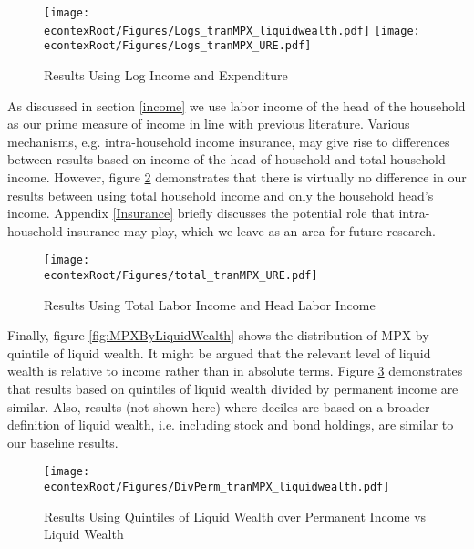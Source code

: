 \documentclass[titlepage]{\econtex}\newcommand{\texname}{ConsumptionHeterogeneity}
\begin{document}
\begin{figure} 
	\begin{centering}
		\texttt{[image: \\econtexRoot/Figures/Logs\_tranMPX\_liquidwealth.pdf]}
		\texttt{[image: \\econtexRoot/Figures/Logs\_tranMPX\_URE.pdf]}
		\caption{Results Using Log Income and Expenditure}
		\label{fig:Robust_Logs}
	\end{centering}
\end{figure}

As discussed in section \ref{income} we use labor income of the head of the household as our prime measure of income in line with previous literature. Various mechanisms, e.g. intra-household income insurance, may give rise to differences between results based on income of the head of household and total household income. However, figure \ref{fig:Robust_TotalvsHead} demonstrates that there is virtually no difference in our results between using total household income and only the household head's income. Appendix \ref{Insurance} briefly discusses the potential role that intra-household insurance may play, which we leave as an area for future research. 

\begin{figure} 
	\begin{centering}
		\texttt{[image: \\econtexRoot/Figures/total\_tranMPX\_URE.pdf]}
		\caption{Results Using Total Labor Income and Head Labor Income}
		\label{fig:Robust_TotalvsHead}
	\end{centering}
\end{figure}

Finally, figure \ref{fig:MPXByLiquidWealth} shows the distribution of MPX by quintile of liquid wealth. It might be argued that the relevant level of liquid wealth is relative to income rather than in absolute terms. Figure \ref{fig:Robust_DivPerm} demonstrates that results based on quintiles of liquid wealth divided by permanent income are similar. Also, results (not shown here) where deciles are based on a broader definition of liquid wealth, i.e. including stock and bond holdings, are similar to our baseline results. 

\begin{figure} 
	\begin{centering}
		\texttt{[image: \\econtexRoot/Figures/DivPerm\_tranMPX\_liquidwealth.pdf]}
		\caption{Results Using Quintiles of Liquid Wealth over Permanent Income vs Liquid Wealth}
		\label{fig:Robust_DivPerm}
	\end{centering}
\end{figure}
\end{document}
